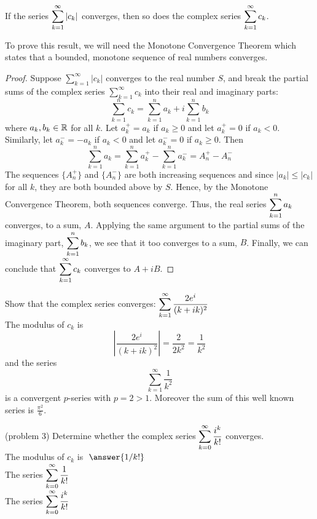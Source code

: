 \documentclass[handout]{ximera}
\begin{document}
\begin{theorem}
If the series $\displaystyle \sum_{k=1}^\infty |c_k|$ converges, then so does the complex series $\displaystyle \sum_{k=1}^\infty c_k$.
\end{theorem}


\begin{remark}
To prove this result, we will need the Monotone Convergence Theorem which states that a bounded, monotone sequence of real numbers converges.
\end{remark}

\begin{proof}
Suppose $\displaystyle \sum_{k=1}^\infty |c_k|$ converges to the real number $S$, and break the partial sums of  the complex series 
$\displaystyle \sum_{k=1}^\infty c_k$ into their real and imaginary parts:
\[
\sum_{k=1}^n c_k =  \sum_{k=1}^n a_k + i\sum_{k=1}^n b_k
\]
where $a_k, b_k \in \mathbb R$ for all $k$.  Let $a_k^+ = a_k$ if $a_k \geq 0$ and let $a_k^+ = 0$ if $a_k < 0$.
Similarly, let $a_k^- = -a_k$ if $a_k < 0$ and let $a_k^- = 0$ if $a_k \geq 0$. Then 
\[
\sum_{k=1}^n a_k = \sum_{k=1}^n a_k^+ - \sum_{k=1}^n a_k^- = A_n^+ - A_n^-
\]
The sequences $\{A_n^+\}$ and $\{A_n^-\}$ are both increasing sequences and since $|a_k| \leq |c_k|$ for all $k$, they are both bounded above by $S$.
Hence, by the Monotone Convergence Theorem, both sequences converge.
Thus, the real series $\displaystyle \sum_{k=1}^n a_k$ converges, to a sum, $A$. Applying the same argument to the partial sums of the imaginary part, 
$\displaystyle \sum_{k=1}^n b_k$, we see that it too converges to a sum, $B$. Finally, we can conclude that $\displaystyle \sum_{k=1}^\infty c_k$ converges to $A + iB$. 
\end{proof}

\begin{example}[example 3]
Show that the complex series converges: $\displaystyle \sum_{k=1}^\infty \frac{2e^i}{(k+ik)^2}$\\
The modulus of $c_k$ is
\[
\left|\frac{2e^i}{(k+ik)^2}\right| = \frac{2}{2k^2} = \frac{1}{k^2}
\]
and the series
\[
\sum_{k=1}^\infty \frac{1}{k^2}
\]
is a convergent $p$-series with $p = 2 > 1$. Moreover the sum of this well known series is $\frac{\pi^2}{6}$.
\end{example}

\begin{problem}(problem 3) 
Determine whether the complex series $\displaystyle \sum_{k=0}^\infty \frac{i^k}{k!}$ converges.\\
The modulus of $c_k$ is $\; \answer{1/k!}$\\
The series $\displaystyle \sum_{k=0}^\infty \frac{1}{k!}\;\;$ \\
The series $\displaystyle \sum_{k=0}^\infty \frac{i^k}{k!}\;\;$ 
\end{problem}
\end{document}
